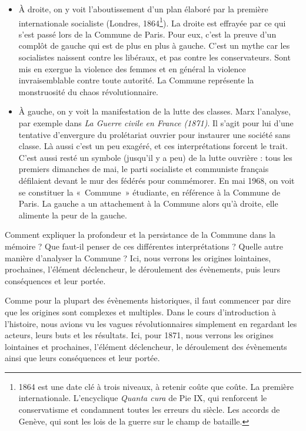 \documentclass[12pt]{report}
\begin{document}
\begin{itemize}
	\item À droite, on y voit l'aboutissement d'un plan élaboré par la première internationale socialiste (Londres, 1864\footnote{1864 est une date clé à trois niveaux, à retenir coûte que coûte. La première internationale. L'encyclique \emph{Quanta cura} de Pie IX, qui renforcent le conservatisme et condamnent toutes les erreurs du siècle. Les accords de Genève, qui sont les lois de la guerre sur le champ de bataille.}). La droite est effrayée par ce qui s'est passé lors de la Commune de Paris. Pour eux, c'est la preuve d'un complôt de gauche qui est de plus en plus à gauche. C'est un mythe car les socialistes naissent contre les libéraux, et pas contre les conservateurs. Sont mis en exergue la violence des femmes et en général la violence invraisemblable contre toute autorité. La Commune représente la monstruosité du chaos révolutionnaire.
	\item À gauche, on y voit la manifestation de la lutte des classes. Marx l’analyse, par exemple dans \emph{La Guerre civile en France (1871)}. Il s’agit pour lui d’une tentative d'envergure du prolétariat ouvrier pour instaurer une société sans classe. Là aussi c'est un peu exagéré, et ces interprétations forcent le trait. C’est aussi resté un symbole (jusqu’il y a peu) de la lutte ouvrière : tous les premiers dimanches de mai, le parti socialiste et communiste français défilaient devant le mur des fédérés pour commémorer. En mai 1968, on voit se constituer la «~Commune~» étudiante, en référence à la Commune de Paris. La gauche a un attachement à la Commune alors qu'à droite, elle alimente la peur de la gauche.
\end{itemize}

Comment expliquer la profondeur et la persistance de la Commune dans la mémoire ? Que faut-il penser de ces différentes interprétations ?
Quelle autre manière d'analyser la Commune ?
Ici, nous verrons les origines lointaines, prochaines, l'élément déclencheur, le déroulement des évènements, puis leurs conséquences et leur portée.

Comme pour la plupart des évènements historiques, il faut commencer par dire que les origines sont complexes et multiples. 
Dans le cours d'introduction à l'histoire, nous avions vu les vagues révolutionnaires simplement en regardant les acteurs, leurs buts et les résultats.
Ici, pour 1871, nous verrons les origines lointaines et prochaines, l'élément déclencheur, le déroulement des évènements ainsi que leurs conséquences et leur portée.
\end{document}
